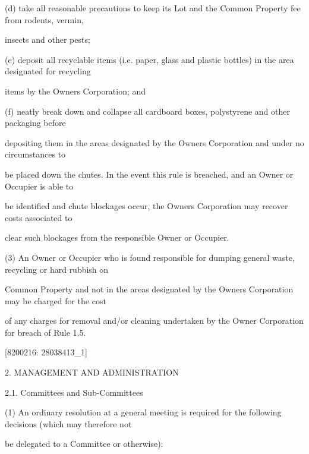 \documentclass{article}
\begin{document}
{\fontsize{9.962}{1}(d) take all reasonable precautions to keep its Lot and the Common Property fee from rodents, vermin, }

{\fontsize{10.02}{1}insects and other pests; }

{\fontsize{9.962}{1}(e) deposit all recyclable items (i.e. paper, glass and plastic bottles) in the area designated for recycling }

{\fontsize{10.02}{1}items by the Owners Corporation; and }

{\fontsize{9.962}{1}(f) neatly break down and collapse all cardboard boxes, polystyrene and other packaging before }

{\fontsize{10.02}{1}depositing them in the areas designated by the Owners Corporation and under no circumstances to }

{\fontsize{10.02}{1}be placed down the chutes. In the event this rule is breached, and an Owner or Occupier is able to }

{\fontsize{10.02}{1}be identified and chute blockages occur, the Owners Corporation may recover costs associated to }

{\fontsize{10.02}{1}clear such blockages from the responsible Owner or Occupier. }

{\fontsize{9.962}{1}(3) An Owner or Occupier who is found responsible for dumping general waste, recycling or hard rubbish on }

{\fontsize{10.02}{1}Common Property and not in the areas designated by the Owners Corporation may be charged for the cost }

{\fontsize{10.02}{1}of any charges for removal and/or cleaning undertaken by the Owner Corporation for breach of Rule 1.5. }


\newpage
















{\fontsize{7.02}{1}[8200216: 28038413\_1] }

{\fontsize{9.99}{1}2. MANAGEMENT AND ADMINISTRATION }

{\fontsize{9.99}{1}2.1. Committees and Sub-Committees }


{\fontsize{9.962}{1}(1) An ordinary resolution at a general meeting is required for the following decisions (which may therefore not }

{\fontsize{10.02}{1}be delegated to a Committee or otherwise): }
\end{document}

